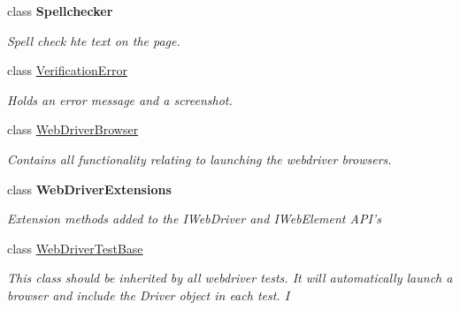 \begin{DoxyCompactItemize}
class {\bfseries Spellchecker}
\begin{DoxyCompactList}\small\item\em Spell check hte text on the page. \end{DoxyCompactList}\item 
class \hyperlink{class_proto_test_1_1_golem_1_1_web_driver_1_1_verification_error}{Verification\-Error}
\begin{DoxyCompactList}\small\item\em Holds an error message and a screenshot. \end{DoxyCompactList}\item 
class \hyperlink{class_proto_test_1_1_golem_1_1_web_driver_1_1_web_driver_browser}{Web\-Driver\-Browser}
\begin{DoxyCompactList}\small\item\em Contains all functionality relating to launching the webdriver browsers. \end{DoxyCompactList}\item 
class {\bfseries Web\-Driver\-Extensions}
\begin{DoxyCompactList}\small\item\em Extension methods added to the I\-Web\-Driver and I\-Web\-Element A\-P\-I's \end{DoxyCompactList}\item 
class \hyperlink{class_proto_test_1_1_golem_1_1_web_driver_1_1_web_driver_test_base}{Web\-Driver\-Test\-Base}
\begin{DoxyCompactList}\small\item\em This class should be inherited by all webdriver tests. It will automatically launch a browser and include the Driver object in each test. I \end{DoxyCompactList}\end{DoxyCompactItemize}
